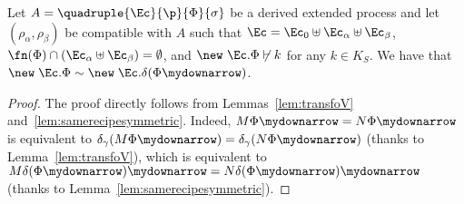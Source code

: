 \begin{corollary}
\label{cor:framestatequiv}
Let $A = \quadruple{\Ec}{\p}{\Phi}{\sigma}$ be a derived extended process and let $(\rho_\alpha, \rho_\beta)$ be compatible with $A$
such
that $\Ec =  \Ec_0 \uplus \Ec_\alpha
\uplus \Ec_\beta$, 
 $\fn(\Phi) \cap (\Ec_\alpha \uplus \Ec_\beta) = \emptyset$, 
and
$\new\ \Ec. \Phi \not\vdash k$ for 
any $k \in K_S$.
We have that
$\new\; \Ec. \Phi \sim
  \new\; \Ec. \delta(\Phi\mydownarrow)$.
\end{corollary}

\begin{proof}
 The proof directly follows from Lemmas~\ref{lem:transfoV}
 and~\ref{lem:samerecipesymmetric}. 
Indeed, $M\Phi\mydownarrow = N\Phi\mydownarrow$ is
 equivalent to $\delta_\gamma(M\Phi\mydownarrow) =
 \delta_\gamma(N\Phi\mydownarrow)$ (thanks to Lemma~\ref{lem:transfoV}), which
 is equivalent to $M\delta(\Phi\mydownarrow)\mydownarrow =
 N\delta(\Phi\mydownarrow)\mydownarrow$ (thanks to Lemma~\ref{lem:samerecipesymmetric}).
\end{proof}

